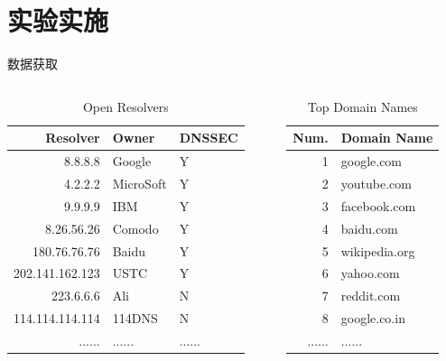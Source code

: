 \documentclass{beamer}
\begin{document}
\section{实验实施}


  \begin{frame}{数据获取}
    \begin{columns}
      
      \begin{column}{0.5\textwidth}
        \begin{table}
          \tiny
        \begin{tabular}{r|l|l}
          \toprule
          Resolver& Owner&DNSSEC\\
          \midrule
          8.8.8.8 & Google&Y \\
          4.2.2.2&     MicroSoft&Y \\
          9.9.9.9&  IBM&Y \\
          8.26.56.26& Comodo&Y \\
          180.76.76.76&Baidu&Y\\
          202.141.162.123&USTC&Y\\
          223.6.6.6&Ali&N \\
          114.114.114.114 & 114DNS&N \\
          ......&...... &......\\
          \bottomrule
          \end{tabular}
          \caption{\scriptsize{Open Resolvers}}
        \end{table}
      \end{column}
      \begin{column}{0.5\textwidth}
        \begin{table}
          \tiny
        \begin{tabular}{r|l}
          \toprule
          Num. & Domain Name\\
          \midrule
          1&google.com\\
          2&youtube.com\\
          3&facebook.com\\
          4&baidu.com\\
          5&wikipedia.org\\
          6&yahoo.com\\
          7&reddit.com\\
          8&google.co.in\\
          ......&...... \\
          \bottomrule
          \end{tabular}
          \caption{\scriptsize{Top Domain Names}}
        \end{table}
      \end{column}
      \end{columns}



\end{frame}
\end{document}
